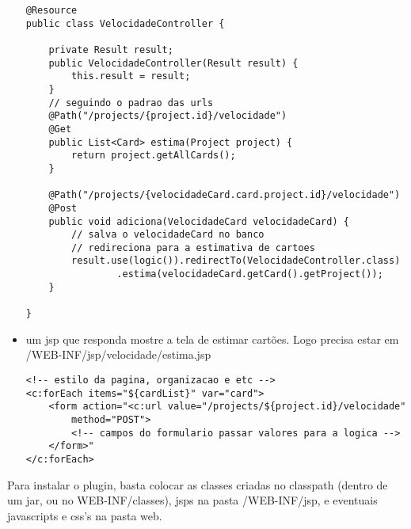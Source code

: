 \begin{itemize}
{\begin{lstlisting}
@Resource
public class VelocidadeController {
	
	private Result result;
	public VelocidadeController(Result result) {
		this.result = result;
	}
	// seguindo o padrao das urls
	@Path("/projects/{project.id}/velocidade")
	@Get
	public List<Card> estima(Project project) {
		return project.getAllCards();
	}

	@Path("/projects/{velocidadeCard.card.project.id}/velocidade")
	@Post
	public void adiciona(VelocidadeCard velocidadeCard) {
		// salva o velocidadeCard no banco
		// redireciona para a estimativa de cartoes
		result.use(logic()).redirectTo(VelocidadeController.class)
				.estima(velocidadeCard.getCard().getProject());
	}
	
}
		\end{lstlisting}
	}
	
	\item{um jsp que responda mostre a tela de estimar cartões. Logo precisa estar em /WEB-INF/jsp/velocidade/estima.jsp
	
		\begin{lstlisting}
<!-- estilo da pagina, organizacao e etc -->
<c:forEach items="${cardList}" var="card">
	<form action="<c:url value="/projects/${project.id}/velocidade" 
		method="POST">
		<!-- campos do formulario passar valores para a logica -->
	</form>"
</c:forEach>
		\end{lstlisting}
	}
\end{itemize}

Para instalar o plugin, basta colocar as classes criadas no classpath (dentro de um jar, ou no WEB-INF/classes),
jsps na pasta /WEB-INF/jsp, e eventuais javascripts e css's na pasta web.


